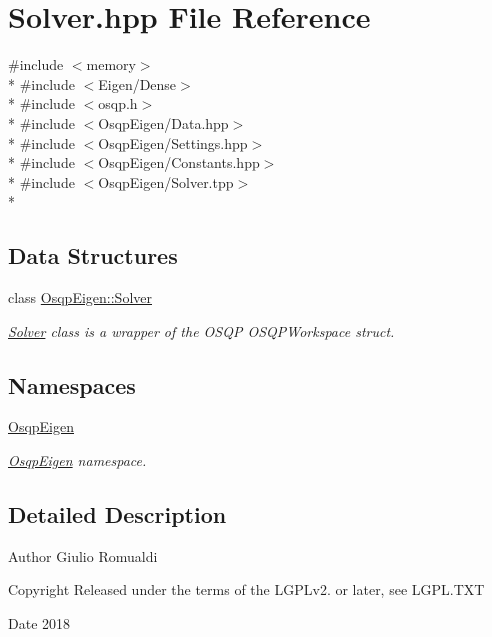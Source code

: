 \section{Solver.\+hpp File Reference}
\label{Solver_8hpp}
{\ttfamily \#include $<$memory$>$}\\*
{\ttfamily \#include $<$Eigen/\+Dense$>$}\\*
{\ttfamily \#include $<$osqp.\+h$>$}\\*
{\ttfamily \#include $<$Osqp\+Eigen/\+Data.\+hpp$>$}\\*
{\ttfamily \#include $<$Osqp\+Eigen/\+Settings.\+hpp$>$}\\*
{\ttfamily \#include $<$Osqp\+Eigen/\+Constants.\+hpp$>$}\\*
{\ttfamily \#include $<$Osqp\+Eigen/\+Solver.\+tpp$>$}\\*
\subsection*{Data Structures}
\begin{DoxyCompactItemize}
\item 
class \hyperlink{classOsqpEigen_1_1Solver}{Osqp\+Eigen\+::\+Solver}
\begin{DoxyCompactList}\small\item\em \hyperlink{classOsqpEigen_1_1Solver}{Solver} class is a wrapper of the O\+S\+QP O\+S\+Q\+P\+Workspace struct. \end{DoxyCompactList}\end{DoxyCompactItemize}
\subsection*{Namespaces}
\begin{DoxyCompactItemize}
\item 
 \hyperlink{namespaceOsqpEigen}{Osqp\+Eigen}
\begin{DoxyCompactList}\small\item\em \hyperlink{namespaceOsqpEigen}{Osqp\+Eigen} namespace. \end{DoxyCompactList}\end{DoxyCompactItemize}


\subsection{Detailed Description}
\begin{DoxyAuthor}{Author}
Giulio Romualdi 
\end{DoxyAuthor}
\begin{DoxyCopyright}{Copyright}
Released under the terms of the L\+G\+P\+Lv2. or later, see L\+G\+P\+L.\+T\+XT 
\end{DoxyCopyright}
\begin{DoxyDate}{Date}
2018 
\end{DoxyDate}
